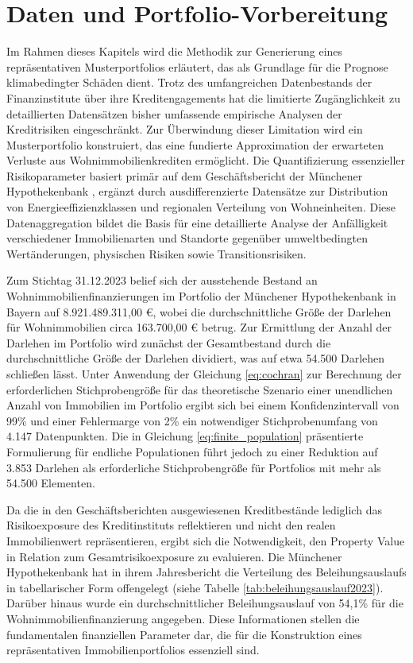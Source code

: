 \section{Daten und Portfolio-Vorbereitung}

Im Rahmen dieses Kapitels wird die Methodik zur Generierung eines repräsentativen Musterportfolios erläutert, das als Grundlage für die Prognose klimabedingter Schäden dient. Trotz des umfangreichen Datenbestands der Finanzinstitute über ihre Kreditengagements hat die limitierte Zugänglichkeit zu detaillierten Datensätzen bisher umfassende empirische Analysen der Kreditrisiken eingeschränkt. Zur Überwindung dieser Limitation wird ein Musterportfolio konstruiert, das eine fundierte Approximation der erwarteten Verluste aus Wohnimmobilienkrediten ermöglicht. Die Quantifizierung essenzieller Risikoparameter basiert primär auf dem Geschäftsbericht der Münchener Hypothekenbank \parencite{MuenchenerHyp2022}, ergänzt durch ausdifferenzierte Datensätze zur Distribution von Energieeffizienzklassen und regionalen Verteilung von Wohneinheiten. Diese Datenaggregation bildet die Basis für eine detaillierte Analyse der Anfälligkeit verschiedener Immobilienarten und Standorte gegenüber umweltbedingten Wertänderungen, physischen Risiken sowie Transitionsrisiken.

Zum Stichtag 31.12.2023 belief sich der ausstehende Bestand an Wohnimmobilienfinanzierungen im Portfolio der Münchener Hypothekenbank in Bayern auf 8.921.489.311,00 €, wobei die durchschnittliche Größe der Darlehen für Wohnimmobilien circa 163.700,00 € betrug. Zur Ermittlung der Anzahl der Darlehen im Portfolio wird zunächst der Gesamtbestand durch die durchschnittliche Größe der Darlehen dividiert, was auf etwa 54.500 Darlehen schließen lässt. Unter Anwendung der Gleichung \ref{eq:cochran} zur Berechnung der erforderlichen Stichprobengröße für das theoretische Szenario einer unendlichen Anzahl von Immobilien im Portfolio ergibt sich bei einem Konfidenzintervall von 99\% und einer Fehlermarge von 2\% ein notwendiger Stichprobenumfang von 4.147 Datenpunkten. Die in Gleichung \ref{eq:finite_population} präsentierte Formulierung für endliche Populationen führt jedoch zu einer Reduktion auf 3.853 Darlehen als erforderliche Stichprobengröße für Portfolios mit mehr als 54.500 Elementen.

Da die in den Geschäftsberichten ausgewiesenen Kreditbestände lediglich das Risikoexposure des Kreditinstituts reflektieren und nicht den realen Immobilienwert repräsentieren, ergibt sich die Notwendigkeit, den Property Value in Relation zum Gesamtrisikoexposure zu evaluieren.
Die Münchener Hypothekenbank hat in ihrem Jahresbericht die Verteilung des Beleihungsauslaufs in tabellarischer Form offengelegt (siehe Tabelle \ref{tab:beleihungsauslauf2023}). Darüber hinaus wurde ein durchschnittlicher Beleihungsauslauf von 54,1\% für die Wohnimmobilienfinanzierung angegeben.
Diese Informationen stellen die fundamentalen finanziellen Parameter dar, die für die Konstruktion eines repräsentativen Immobilienportfolios essenziell sind.

